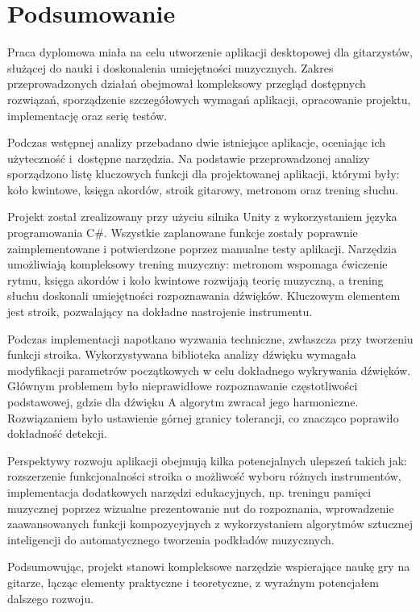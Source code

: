\chapter{Podsumowanie}

Praca dyplomowa miała na celu utworzenie aplikacji desktopowej dla gitarzystów, służącej do nauki i doskonalenia umiejętności muzycznych. Zakres przeprowadzonych działań obejmował kompleksowy przegląd dostępnych rozwiązań, sporządzenie szczegółowych wymagań aplikacji, opracowanie projektu, implementację oraz serię testów.

Podczas wstępnej analizy przebadano dwie istniejące aplikacje, oceniając ich użyteczność i~dostępne narzędzia. Na podstawie przeprowadzonej analizy sporządzono listę kluczowych funkcji dla projektowanej aplikacji, którymi były: koło kwintowe, księga akordów, stroik gitarowy, metronom oraz trening słuchu.

Projekt został zrealizowany przy użyciu silnika Unity z wykorzystaniem języka programowania C\#. Wszystkie zaplanowane funkcje zostały poprawnie zaimplementowane i potwierdzone poprzez manualne testy aplikacji. Narzędzia umożliwiają kompleksowy trening muzyczny: metronom wspomaga ćwiczenie rytmu, księga akordów i koło kwintowe rozwijają teorię muzyczną, a trening słuchu doskonali umiejętności rozpoznawania dźwięków. Kluczowym elementem jest stroik, pozwalający na dokładne nastrojenie instrumentu.

Podczas implementacji napotkano wyzwania techniczne, zwłaszcza przy tworzeniu funkcji stroika. Wykorzystywana biblioteka analizy dźwięku wymagała modyfikacji parametrów początkowych w celu dokładnego wykrywania dźwięków. Głównym problemem było nieprawidłowe rozpoznawanie częstotliwości podstawowej, gdzie dla dźwięku A algorytm zwracał jego harmoniczne. Rozwiązaniem było ustawienie górnej granicy tolerancji, co znacząco poprawiło dokładność detekcji.

Perspektywy rozwoju aplikacji obejmują kilka potencjalnych ulepszeń takich jak: rozszerzenie funkcjonalności stroika o możliwość wyboru różnych instrumentów, implementacja dodatkowych narzędzi edukacyjnych, np. treningu pamięci muzycznej poprzez wizualne prezentowanie nut do rozpoznania, wprowadzenie zaawansowanych funkcji kompozycyjnych z wykorzystaniem algorytmów sztucznej inteligencji do automatycznego tworzenia podkładów muzycznych.

Podsumowując, projekt stanowi kompleksowe narzędzie wspierające naukę gry na gitarze, łącząc elementy praktyczne i teoretyczne, z wyraźnym potencjałem dalszego rozwoju.

